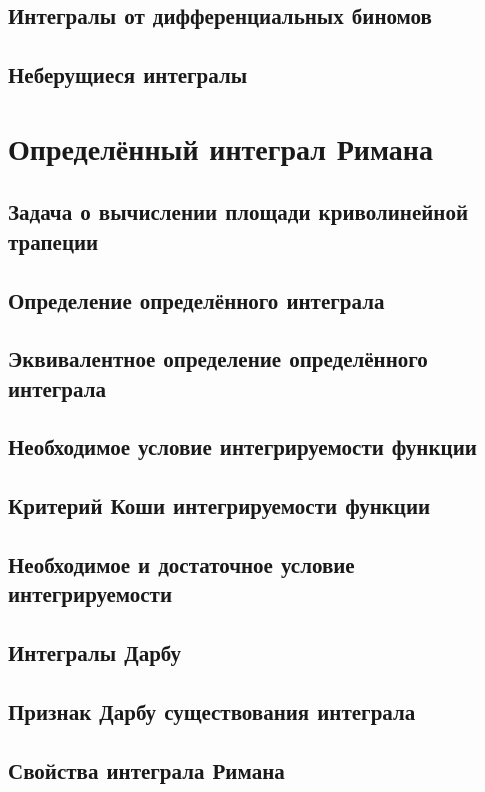 \subsection{Интегралы от дифференциальных биномов}
 
\subsection{Неберущиеся интегралы}


\section{Определённый интеграл Римана}
\subsection{Задача о вычислении площади криволинейной трапеции}

\subsection{Определение определённого интеграла}

\subsection{Эквивалентное определение определённого интеграла}

\subsection{Необходимое условие интегрируемости функции}
\subsection{Критерий Коши интегрируемости функции}
\subsection{Необходимое и достаточное условие интегрируемости}
\subsection{Интегралы Дарбу}
\subsection{Признак Дарбу существования интеграла}
\subsection{Свойства интеграла Римана}
